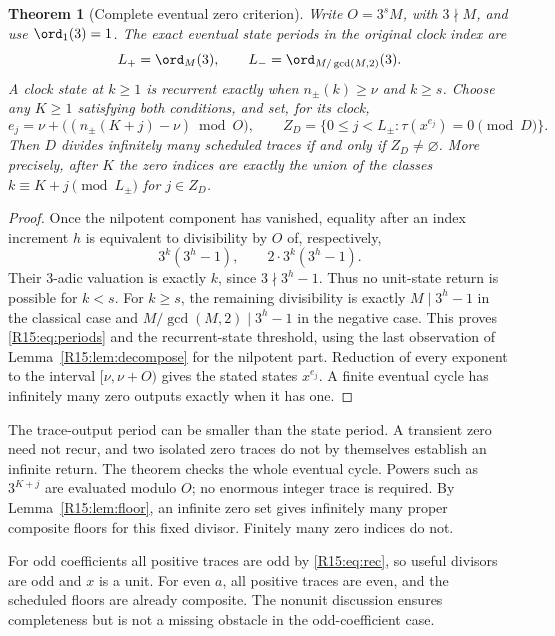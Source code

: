 \documentclass[11pt,a4paper]{article}
\newtheorem{theorem}{Theorem}[section]
\theoremstyle{definition}\newtheorem{definition}[theorem]{Definition}
\theoremstyle{remark}\newtheorem{remark}[theorem]{Remark}
\begin{document}
\begin{theorem}[Complete eventual zero criterion]\label{R15:thm:local}
Write $O=3^sM$, with $3\nmid M$, and use $\ord_1(3)=1$.
The exact eventual state periods in the original clock index are
\begin{equation}\label{R15:eq:periods}
 L_+=\ord_M(3),\qquad
 L_-=\ord_{M/\gcd(M,2)}(3).
\end{equation}
A clock state at $k\ge1$ is recurrent exactly when
$n_\pm(k)\ge\nu$ and $k\ge s$.
Choose any $K\ge1$ satisfying both conditions, and set, for its clock,
\[
 e_j=\nu+\bigl((n_\pm(K+j)-\nu)\bmod O\bigr),\qquad
 Z_D=\{0\le j<L_\pm:\tau(x^{e_j})=0\pmod D\}.
\]
Then $D$ divides infinitely many scheduled traces if and only if
$Z_D\ne\varnothing$. More precisely, after $K$ the zero indices
are exactly the union of the classes $k\equiv K+j\pmod{L_\pm}$
for $j\in Z_D$.
\end{theorem}
\begin{proof}
Once the nilpotent component has vanished, equality after an index
increment $h$ is equivalent to divisibility by $O$ of, respectively,
\[
 3^k(3^h-1),\qquad2\cdot3^k(3^h-1).
\]
Their $3$-adic valuation is exactly $k$, since $3\nmid3^h-1$.
Thus no unit-state return is possible for $k<s$. For $k\ge s$,
the remaining divisibility is exactly $M\mid3^h-1$ in the
classical case and $M/\gcd(M,2)\mid3^h-1$ in the negative case.
This proves \eqref{R15:eq:periods} and the recurrent-state threshold,
using the last observation of Lemma~\ref{R15:lem:decompose} for the
nilpotent part. Reduction of every exponent to the interval
$[\nu,\nu+O)$ gives the stated states $x^{e_j}$. A finite eventual
cycle has infinitely many zero outputs exactly when it has one.
\end{proof}

The trace-output period can be smaller than the state period.
A transient zero need not recur, and two isolated zero traces do not
by themselves establish an infinite return. The theorem checks the
whole eventual cycle. Powers such as $3^{K+j}$ are evaluated modulo
$O$; no enormous integer trace is required. By Lemma~\ref{R15:lem:floor},
an infinite zero set gives infinitely many proper composite floors
for this fixed divisor. Finitely many zero indices do not.

For odd coefficients all positive traces are odd by \eqref{R15:eq:rec},
so useful divisors are odd and $x$ is a unit. For even $a$, all
positive traces are even, and the scheduled floors are already
composite. The nonunit discussion ensures completeness but is not
a missing obstacle in the odd-coefficient case.
\end{document}
